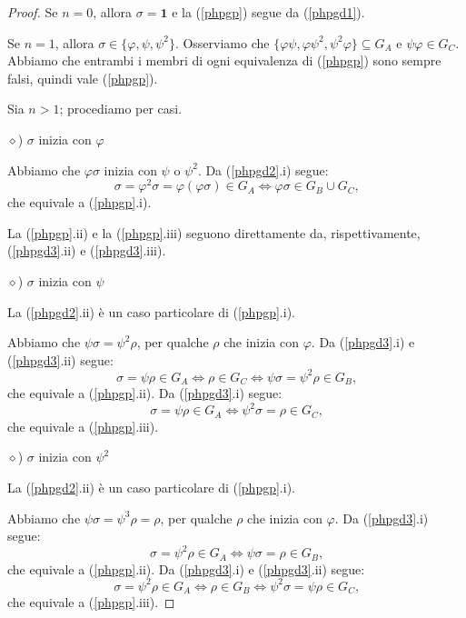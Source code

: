 \documentclass[a4paper,oneside,11pt]{book}
\theoremstyle{definition} \newtheorem{Def}{Definizione}
\theoremstyle{plain} \newtheorem{teo}{Teorema}
\theoremstyle{plain} \newtheorem{cor}[teo]{Corollario}
\theoremstyle{definition} \newtheorem{lem}[teo]{Lemma}
\theoremstyle{plain} \newtheorem{pro}[teo]{Proposizione}
\newcommand{\ug}[1]{(\ref{#1})} %
\begin{document}
\begin{proof}
		Se $n = 0$, allora $\sigma = \mathbf{1}$ e la \ug{phpgp} segue da \ug{phpgd1}.
		
		Se $n = 1$, allora $\sigma \in \{\varphi, \psi, \psi^2\}$. Osserviamo che $\{\varphi\psi, \varphi\psi^2, \psi^2\varphi\} \subseteq G_A$ e $\psi\varphi \in G_C$. Abbiamo che entrambi i membri di ogni equivalenza di \ug{phpgp} sono sempre falsi, quindi vale \ug{phpgp}.
		
		Sia $n>1$; procediamo per casi.
		
		$\diamond$) $\sigma$ inizia con $\varphi$
		
		Abbiamo che $\varphi\sigma$ inizia con $\psi$ o $\psi^2$. Da (\ref{phpgd2}.i) segue:
		\begin{equation*}
			\sigma = \varphi^2\sigma = \varphi(\varphi\sigma) \in G_A \Leftrightarrow \varphi\sigma \in G_B \cup G_C \text{,}
		\end{equation*}
		che equivale a (\ref{phpgp}.i).
		
		La (\ref{phpgp}.ii) e la (\ref{phpgp}.iii) seguono direttamente da, rispettivamente, (\ref{phpgd3}.ii) e (\ref{phpgd3}.iii).
		
		$\diamond$) $\sigma$ inizia con $\psi$
		
		La (\ref{phpgd2}.ii) è un caso particolare di (\ref{phpgp}.i).
		
		Abbiamo che $\psi\sigma = \psi^2\rho$, per qualche $\rho$ che inizia con $\varphi$. Da (\ref{phpgd3}.i) e (\ref{phpgd3}.ii) segue:
		\begin{equation*}
			\sigma = \psi\rho \in G_A \Leftrightarrow \rho \in G_C \Leftrightarrow \psi\sigma = \psi^2\rho \in G_B \text{,}
		\end{equation*}
		che equivale a (\ref{phpgp}.ii). Da (\ref{phpgd3}.i) segue:
		\begin{equation*}
			\sigma = \psi\rho \in G_A \Leftrightarrow \psi^2\sigma = \rho \in G_C \text{,}
		\end{equation*}
		che equivale a (\ref{phpgp}.iii).
	
		$\diamond$) $\sigma$ inizia con $\psi^2$
		
		La (\ref{phpgd2}.ii) è un caso particolare di (\ref{phpgp}.i).
		
		Abbiamo che $\psi\sigma = \psi^3\rho = \rho$, per qualche $\rho$ che inizia con $\varphi$. Da (\ref{phpgd3}.i) segue:
		\begin{equation*}
			\sigma = \psi^2\rho \in G_A \Leftrightarrow \psi\sigma = \rho \in G_B \text{,}
		\end{equation*}
		che equivale a (\ref{phpgp}.ii). Da (\ref{phpgd3}.i) e (\ref{phpgd3}.ii) segue:
		\begin{equation*}
			\sigma = \psi^2\rho \in G_A \Leftrightarrow \rho \in G_B \Leftrightarrow \psi^2\sigma = \psi\rho \in G_C \text{,}
		\end{equation*}
		che equivale a (\ref{phpgp}.iii).
	\end{proof}
	
\end{document}
